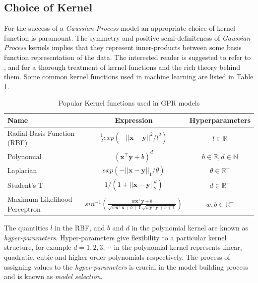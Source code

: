\documentclass{article}
\begin{document}
\subsection{Choice of Kernel}

For the success of a \emph{Gaussian Process} model an appropriate choice of kernel function is paramount. The symmetry and positive semi-definiteness of \emph{Gaussian Process} kernels implies that they represent inner-products between some basis function representation of the data. The interested reader is suggested to refer to \citet{Berlinet2004}, \citet{Scholkopf:2001:LKS:559923} and \citet{hofmann2008} for a thorough treatment of kernel functions and the rich theory behind them. Some common kernel functions used in machine learning are listed in Table \ref{table:kernel}.

\begin{table}[h]
\caption{Popular Kernel functions used in GPR models}
\centering
\begin{tabular}{l c c}
\hline
 Name  & Expression & Hyperparameters  \\
\hline
  Radial Basis Function (RBF)  & $\frac{1}{2} exp(-||\mathbf{x} - \mathbf{y}||^2/l^2)$  & $l \in \mathbb{R}$   \\
  
  Polynomial  & $(\mathbf{x}^\intercal \mathbf{y} + b)^d$ & $b \in \mathbb{R}, d \in \mathbb{N}$   \\
  
  Laplacian  & $exp(-||\mathbf{x} - \mathbf{y}||_{1}/\theta)$  & $\theta \in \mathbb{R}^+$  \\
  
  Student's T  & $1/(1 + ||\mathbf{x} - \mathbf{y}||_{2}^d)$ & $d \in \mathbb{R}^{+}$\\
  
  Maximum Likelihood Perceptron  & $sin^{-1}(\frac{w\mathbf{x}^\intercal \mathbf{y} + b}{\sqrt{w\mathbf{x}^\intercal \mathbf{x} + b + 1} \sqrt{w\mathbf{y}^\intercal \mathbf{y} + b + 1}})$ & $w, b \in \mathbb{R}^{+}$\\
\hline
\end{tabular}
\label{table:kernel}
\end{table}

The quantities $l$ in the RBF, and $b$ and $d$ in the polynomial kernel are known as \emph{hyper-parameters}. Hyper-parameters give flexibility to a particular kernel structure, for example $d = 1, 2, 3, \cdots$ in the polynomial kernel represents linear, quadratic, cubic and higher order polynomials respectively. The process of assigning values to the \emph{hyper-parameters} is crucial in the model building process and is known as \emph{model selection}. 
\end{document}
